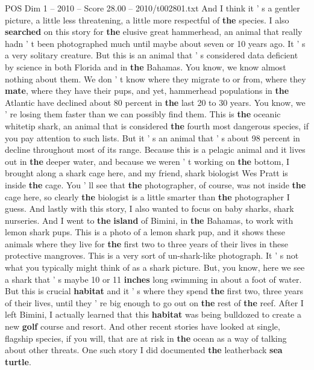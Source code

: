 \begin{textsample}{POS Dim 1 – 2010 – Score 28.00 – 2010/t002801.txt}
And I think it ' s a gentler picture, a little less threatening, a little more respectful of \textbf{the} species.
I also \textbf{searched} on this story for \textbf{the} elusive great hammerhead, an animal that really hadn ' t been photographed much until maybe about seven or 10 years ago.
It ' s a very solitary creature.
But this is an animal that ' s considered data deficient by science in both Florida and in \textbf{the} Bahamas.
You know, we know almost nothing about them.
We don ' t know where they migrate to or from, where they \textbf{mate}, where they have their pups, and yet, hammerhead populations in \textbf{the} Atlantic have declined about 80 percent in \textbf{the} last 20 to 30 years.
You know, we ' re losing them faster than we can possibly find them.
This is \textbf{the} oceanic whitetip shark, an animal that is considered \textbf{the} fourth most dangerous species, if you pay attention to such lists.
But it ' s an animal that ' s about 98 percent in decline throughout most of its range.
Because this is a pelagic animal and it lives out in \textbf{the} deeper water, and because we weren ' t working on \textbf{the} bottom, I brought along a shark cage here, and my friend, shark biologist Wes Pratt is inside \textbf{the} cage.
You ' ll see that \textbf{the} photographer, of course, was not inside \textbf{the} cage here, so clearly \textbf{the} biologist is a little smarter than \textbf{the} photographer I guess.
And lastly with this story, I also wanted to focus on baby sharks, shark nurseries.
And I went to \textbf{the} \textbf{island} of Bimini, in \textbf{the} Bahamas, to work with lemon shark pups.
This is a photo of a lemon shark pup, and it shows these animals where they live for \textbf{the} first two to three years of their lives in these protective mangroves.
This is a very sort of un-shark-like photograph.
It ' s not what you typically might think of as a shark picture.
But, you know, here we see a shark that ' s maybe 10 or 11 \textbf{inches} long swimming in about a foot of water.
But this is crucial \textbf{habitat} and it ' s where they spend \textbf{the} first two, three years of their lives, until they ' re big enough to go out on \textbf{the} rest of \textbf{the} reef.
After I left Bimini, I actually learned that this \textbf{habitat} was being bulldozed to create a new \textbf{golf} course and resort.
And other recent stories have looked at single, flagship species, if you will, that are at risk in \textbf{the} ocean as a way of talking about other threats.
One such story I did documented \textbf{the} leatherback \textbf{sea} \textbf{turtle}.

\end{textsample}
